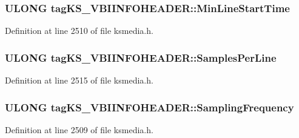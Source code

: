 \subsubsection[{\texorpdfstring{Min\+Line\+Start\+Time}{MinLineStartTime}}]{\setlength{\rightskip}{0pt plus 5cm}U\+L\+O\+NG tag\+K\+S\+\_\+\+V\+B\+I\+I\+N\+F\+O\+H\+E\+A\+D\+E\+R\+::\+Min\+Line\+Start\+Time}\hypertarget{structtag_k_s___v_b_i_i_n_f_o_h_e_a_d_e_r_ad9c99dea90e7f88be48f620cd61365be}{}\label{structtag_k_s___v_b_i_i_n_f_o_h_e_a_d_e_r_ad9c99dea90e7f88be48f620cd61365be}


Definition at line 2510 of file ksmedia.\+h.

\subsubsection[{\texorpdfstring{Samples\+Per\+Line}{SamplesPerLine}}]{\setlength{\rightskip}{0pt plus 5cm}U\+L\+O\+NG tag\+K\+S\+\_\+\+V\+B\+I\+I\+N\+F\+O\+H\+E\+A\+D\+E\+R\+::\+Samples\+Per\+Line}\hypertarget{structtag_k_s___v_b_i_i_n_f_o_h_e_a_d_e_r_a0d21941f9eadb8d64d1842ca837a7144}{}\label{structtag_k_s___v_b_i_i_n_f_o_h_e_a_d_e_r_a0d21941f9eadb8d64d1842ca837a7144}


Definition at line 2515 of file ksmedia.\+h.

\subsubsection[{\texorpdfstring{Sampling\+Frequency}{SamplingFrequency}}]{\setlength{\rightskip}{0pt plus 5cm}U\+L\+O\+NG tag\+K\+S\+\_\+\+V\+B\+I\+I\+N\+F\+O\+H\+E\+A\+D\+E\+R\+::\+Sampling\+Frequency}\hypertarget{structtag_k_s___v_b_i_i_n_f_o_h_e_a_d_e_r_a8f1ace45447e433f0cce883493558c8e}{}\label{structtag_k_s___v_b_i_i_n_f_o_h_e_a_d_e_r_a8f1ace45447e433f0cce883493558c8e}


Definition at line 2509 of file ksmedia.\+h.

